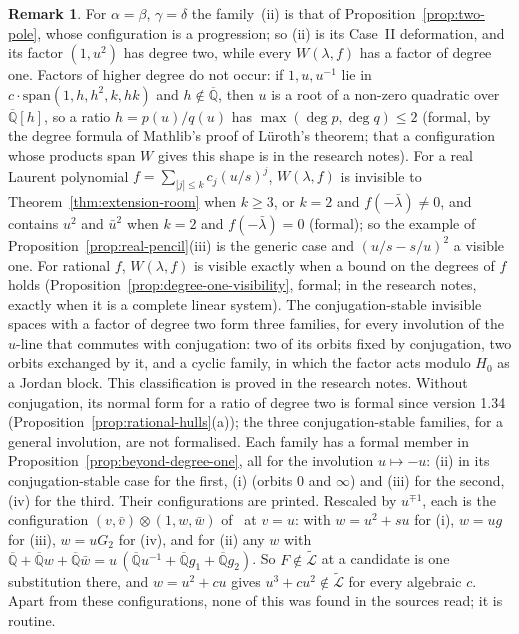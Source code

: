 \documentclass[11pt,a4paper]{article}
\theoremstyle{plain}
\theoremstyle{definition}
\newtheorem{remark}[theorem]{Remark}
\newcommand{\Alg}{\overline{\mathbb{Q}}}
\newcommand{\aLogs}{\widetilde{\mathcal{L}}}
\begin{document}
\begin{remark}\label{rem:degree-bound-visibility}
For $\alpha=\beta$, $\gamma=\delta$ the family~(ii) is that of Proposition~\ref{prop:two-pole}, whose configuration
is a progression; so (ii) is its Case~II deformation, and its factor $(1,u^{2})$ has degree two, while every
$W(\lambda,f)$ has a factor of degree one. Factors of higher degree do not occur: if $1,u,u^{-1}$ lie in
$c\cdot\mathrm{span}(1,h,h^{2},k,hk)$ and $h\notin\Alg$, then $u$ is a root of a non-zero quadratic over $\Alg[h]$,
so a ratio $h=p(u)/q(u)$ has $\max(\deg p,\deg q)\leq2$ (formal, by the degree formula of Mathlib's proof of
L\"uroth's theorem; that a configuration whose products span $W$ gives this shape is in the research notes). For a
real Laurent polynomial $f=\sum_{|j|\leq k}c_{j}(u/s)^{j}$, $W(\lambda,f)$ is invisible to
Theorem~\ref{thm:extension-room} when $k\geq3$, or $k=2$ and $f(-\bar\lambda)\neq0$, and contains $u^{2}$ and $\bar u^{2}$
when $k=2$ and $f(-\bar\lambda)=0$ (formal); so the example of Proposition~\ref{prop:real-pencil}(iii) is the generic
case and $(u/s-s/u)^{2}$ a visible one. For rational $f$, $W(\lambda,f)$ is visible exactly when a bound on the
degrees of $f$ holds (Proposition~\ref{prop:degree-one-visibility}, formal; in the research notes, exactly when it
is a complete linear system). The conjugation-stable invisible spaces with a factor of degree two form three families,
for every involution of the $u$-line that commutes with conjugation: two of its orbits fixed by conjugation, two
orbits exchanged by it, and a cyclic family, in which the factor acts modulo $H_{0}$ as a Jordan block. This
classification is proved in the research notes. Without conjugation, its normal form for a ratio of degree two is
formal since version 1.34 (Proposition~\ref{prop:rational-hulls}(a)); the three conjugation-stable families, for a
general involution, are not formalised. Each family has a formal member in
Proposition~\ref{prop:beyond-degree-one}, all for the involution $u\mapsto-u$: (ii) in its conjugation-stable case
for the first, (i) (orbits $0$ and $\infty$) and (iii) for the second, (iv) for the third. Their configurations are
printed. Rescaled by $u^{\mp1}$, each is the configuration $(v,\bar v)\otimes(1,w,\bar w)$
of~\cite[Th\'eor\`eme~7(1)]{diaz-2007} at $v=u$: with $w=u^{2}+su$ for (i), $w=ug$ for (iii), $w=uG_{2}$ for (iv),
and for (ii) any $w$ with $\Alg+\Alg w+\Alg\bar w=u\,(\Alg u^{-1}+\Alg g_{1}+\Alg g_{2})$. So $F\notin\aLogs$ at a
candidate is one substitution there, and $w=u^{2}+cu$ gives $u^{3}+cu^{2}\notin\aLogs$ for every algebraic $c$. Apart
from these configurations, none of this was found in the sources read; it is routine.
\end{remark}
\end{document}
